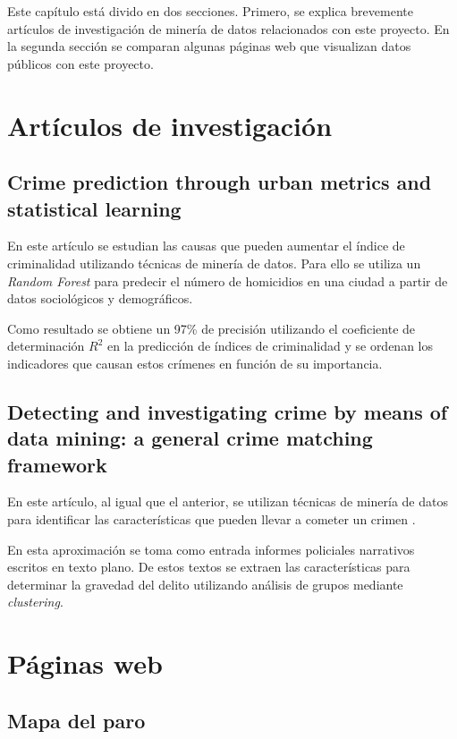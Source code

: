 
Este capítulo está divido en dos secciones. Primero, se explica brevemente artículos de investigación de minería de datos relacionados con este proyecto. En la segunda sección se comparan algunas páginas web que visualizan datos públicos con este proyecto.

\section{Artículos de investigación}

\subsection{Crime prediction through urban metrics and statistical learning}

En este artículo se estudian las causas que pueden aumentar el índice de criminalidad utilizando técnicas de minería de datos. Para ello se utiliza un \textit{Random Forest} para predecir el número de homicidios en una ciudad a partir de datos sociológicos y demográficos. \cite{art:crimeprediction}

Como resultado se obtiene un 97\% de precisión utilizando el coeficiente de determinación $R^{2}$ \cite{wiki:r2} en la predicción de índices de criminalidad y se ordenan los indicadores que causan estos crímenes en función de su importancia.

\subsection{Detecting and investigating crime by means of data mining: a general crime matching framework}

En este artículo, al igual que el anterior, se utilizan técnicas de minería de datos para identificar las características que pueden llevar a cometer un crimen \cite{art:crimeprediction2}.

En esta aproximación se toma como entrada informes policiales narrativos escritos en texto plano. De estos textos se extraen las características para determinar la gravedad del delito utilizando análisis de grupos mediante \textit{clustering}.

\section{Páginas web}

\subsection{Mapa del paro}

